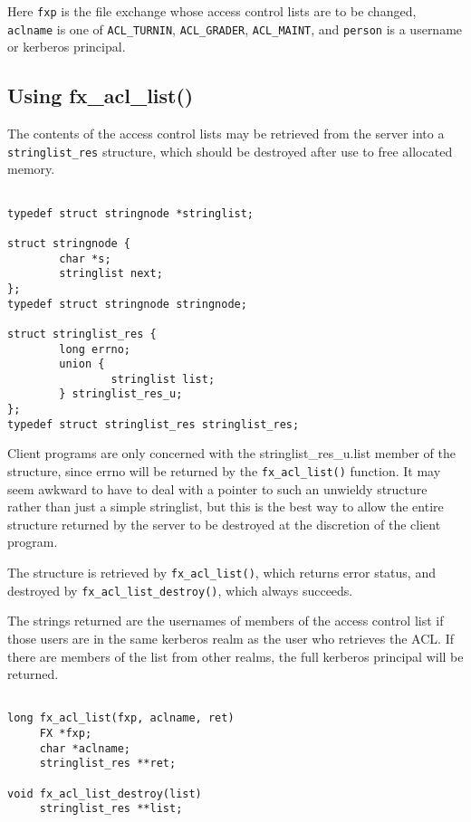 Here \verb+fxp+ is the file exchange whose access control lists are to
be changed, \verb+aclname+ is one of \verb+ACL_TURNIN+,
\verb+ACL_GRADER+, \verb+ACL_MAINT+, and \verb+person+ is a username
or kerberos principal.

\subsection{Using fx\_acl\_list()}

The contents of the access control lists may be retrieved from the
server into a \verb+stringlist_res+ structure, which should be
destroyed after use to free allocated memory.

\begin{verbatim}

typedef struct stringnode *stringlist;

struct stringnode {
        char *s;
        stringlist next;
};
typedef struct stringnode stringnode;

struct stringlist_res {
        long errno;
        union {
                stringlist list;
        } stringlist_res_u;
};
typedef struct stringlist_res stringlist_res;

\end{verbatim}

Client programs are only concerned with the stringlist\_res\_u.list
member of the structure, since errno will be returned by the
\verb+fx_acl_list()+ function.  It may seem awkward to have to deal
with a pointer to such an unwieldy structure rather than just a simple
stringlist, but this is the best way to allow the entire structure
returned by the server to be destroyed at the discretion of the
client program.

The structure is retrieved by \verb+fx_acl_list()+, which returns
error status, and destroyed by \verb+fx_acl_list_destroy()+, which
always succeeds.

The strings returned are the usernames of members of the access control
list if those users are in the same kerberos realm as the user who
retrieves the ACL.  If there are members of the list from other realms,
the full kerberos principal will be returned.

\begin{verbatim}

long fx_acl_list(fxp, aclname, ret)
     FX *fxp;
     char *aclname;
     stringlist_res **ret;

void fx_acl_list_destroy(list)
     stringlist_res **list;

\end{verbatim}

